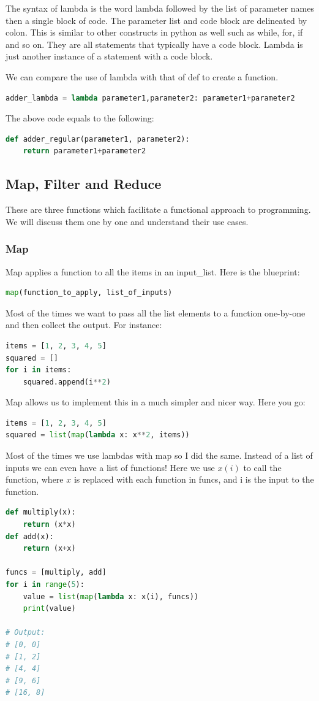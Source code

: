 \documentclass[../main.tex]{subfiles}
\begin{document}
The syntax of lambda is the word lambda followed by the list of parameter names then a single block of code. The parameter list and code block are delineated by colon. This is similar to other constructs in python as well such as while, for, if and so on. They are all statements that typically have a code block. Lambda is just another instance of a statement with a code block.

We can compare the use of lambda with that of def to create a function.
\begin{lstlisting}[language = Python]
adder_lambda = lambda parameter1,parameter2: parameter1+parameter2
\end{lstlisting}
The above code equals to the following:
\begin{lstlisting}[language = Python]
def adder_regular(parameter1, parameter2): 
    return parameter1+parameter2
\end{lstlisting}



\subsection{Map, Filter and Reduce}

These are three functions which facilitate a functional approach to programming. We will discuss them one by one and understand their use cases.
\subsubsection{Map}
Map applies a function to all the items in an input\_list. Here is the blueprint:
\begin{lstlisting}[language=Python]
map(function_to_apply, list_of_inputs)
\end{lstlisting}

Most of the times we want to pass all the list elements to a function one-by-one and then collect the output. For instance:
\begin{lstlisting}[language=Python]
items = [1, 2, 3, 4, 5]
squared = []
for i in items:
    squared.append(i**2)
\end{lstlisting}
Map allows us to implement this in a much simpler and nicer way. Here you go:
\begin{lstlisting}[language=Python]
items = [1, 2, 3, 4, 5]
squared = list(map(lambda x: x**2, items))
\end{lstlisting}
Most of the times we use lambdas with map so I did the same. Instead of a list of inputs we can even have a list of functions! Here we use $x(i)$ to call the function, where $x$ is replaced with each function in funcs, and i is the input to the function.
\begin{lstlisting}[language=Python]
def multiply(x):
    return (x*x)
def add(x):
    return (x+x)

funcs = [multiply, add]
for i in range(5):
    value = list(map(lambda x: x(i), funcs))
    print(value)

# Output:
# [0, 0]
# [1, 2]
# [4, 4]
# [9, 6]
# [16, 8]
\end{lstlisting}
\end{document}
